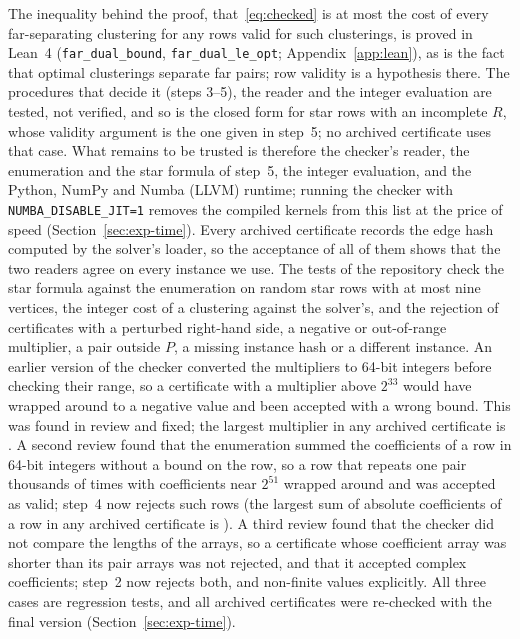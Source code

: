 The inequality behind the proof, that~\eqref{eq:checked} is at most the cost
of every far-separating clustering for any rows valid for such clusterings,
is proved in Lean~4 (\texttt{far\_dual\_bound}, \texttt{far\_dual\_le\_opt};
Appendix~\ref{app:lean}), as is the fact that optimal clusterings separate far
pairs; row validity is a hypothesis there.  The procedures that decide it
(steps 3--5), the reader and the integer evaluation are tested, not verified,
and so is the closed form for star rows with an incomplete $R$, whose
validity argument is the one given in step~5; no archived certificate uses
that case.  What remains to be trusted is therefore the checker's reader, the
enumeration and the star formula of step~5, the integer evaluation, and the
Python, NumPy and Numba (LLVM) runtime; running the checker with
\texttt{NUMBA\_DISABLE\_JIT=1} removes the compiled kernels from this list
at the price of speed (Section~\ref{sec:exp-time}).  Every archived certificate records the edge
hash computed by the solver's loader, so the acceptance of all of them shows
that the two readers agree on every instance we use.  The tests of the
repository check the star formula against the enumeration on random star
rows with at most nine vertices, the integer cost of a clustering against the
solver's, and the rejection of certificates with a perturbed right-hand side,
a negative or out-of-range multiplier, a pair outside $P$, a missing instance
hash or a different instance.  An earlier version of the checker converted
the multipliers to 64-bit integers before checking their range, so a
certificate with a multiplier above $2^{33}$ would have wrapped around to a
negative value and been accepted with a wrong bound.  This was found in
review and fixed; the largest multiplier in any archived certificate is \numMaxY{}.
A second review found that the enumeration summed the coefficients of a row
in 64-bit integers without a bound on the row, so a row that repeats one pair
thousands of times with coefficients near $2^{51}$ wrapped around and was
accepted as valid; step~4 now rejects such rows (the largest sum of absolute
coefficients of a row in any archived certificate is \numMaxRowAbs{}).  A third
review found that the checker did not compare the lengths of the arrays, so
a certificate whose coefficient array was shorter than its pair arrays was
not rejected, and that it accepted complex coefficients; step~2 now rejects
both, and non-finite values explicitly.  All three cases are regression
tests, and all archived certificates were re-checked with the final version
(Section~\ref{sec:exp-time}).

